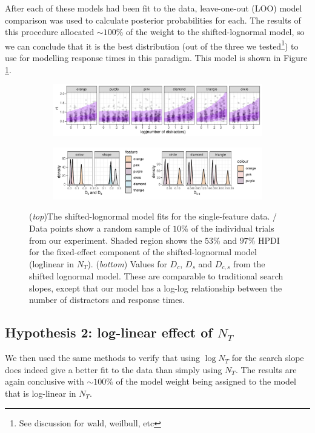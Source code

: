 \documentclass[preprint,12pt,authoryear]{elsarticle}
\begin{document}
After each of these models had been fit to the data, leave-one-out (LOO) model comparison was used to calculate posterior probabilities for each. The results of this procedure allocated $\sim100\%$ of the weight to the shifted-lognormal model, so we can conclude that it is the best distribution (out of the three we tested\footnote{See discussion for wald, weilbull, etc}) to use for modelling response times in this paradigm. This model is shown in Figure \ref{fig:sftln_sf}.

\begin{figure}[th]
\begin{subfigure}
\centering
\includegraphics[width=\textwidth]{../plots/sft_ln_model.pdf}
\end{subfigure}
\begin{subfigure}
\centering
\includegraphics[width=\textwidth]{../plots/Dcs.pdf}
\end{subfigure}
\caption{(\textit{top})The shifted-lognormal model fits for the single-feature data. / Data points show a random sample of $10\%$ of the individual trials from our experiment. Shaded region shows the $53\%$ and $97\%$ HPDI for the fixed-effect component of the shifted-lognormal model (loglinear in $N_T$). (\textit{bottom}) Values for $D_c$, $D_s$ and $D_{c,s}$ from the shifted lognormal model. These are comparable to traditional search slopes, except that our model has a log-log relationship between the number of distractors and response times.}
\label{fig:sftln_sf}
\end{figure}

\subsection{Hypothesis 2: log-linear effect of $N_T$}

We then used the same methods to verify that using $\log{N_T}$ for the search slope does indeed give a better fit to the data than simply using $N_T$. The results are again conclusive with $\sim100\%$ of the model weight being assigned to the model that is log-linear in $N_T$. 
\end{document}
